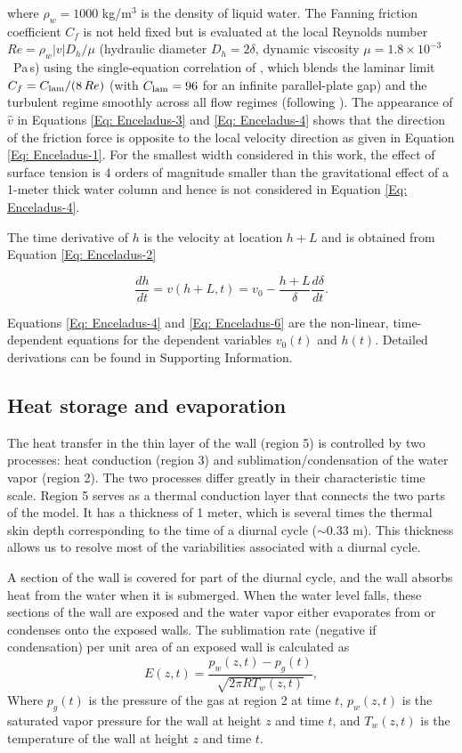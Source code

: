 \documentclass[draft]{agujournal2019}
\begin{document}
where $\rho_w=1000$ kg/m$^3$ is the density of liquid water. The Fanning friction coefficient $C_f$ is not held fixed but is evaluated at the local Reynolds number $Re = \rho_w |v| D_h / \mu$ (hydraulic diameter $D_h = 2\delta$, dynamic viscosity $\mu = 1.8\times10^{-3}$~Pa\,s) using the single-equation correlation of , which blends the laminar limit $C_f = C_{\rm lam}/(8\,Re)$ (with $C_{\rm lam}=96$ for an infinite parallel-plate gap) and the turbulent regime smoothly across all flow regimes (following ). The appearance of $\hat{v}$ in Equations \ref{Eq: Enceladus-3} and \ref{Eq: Enceladus-4} shows that the direction of the friction force is opposite to the local velocity direction as given in Equation \ref{Eq: Enceladus-1}. For the smallest width considered in this work, the effect of surface tension is 4 orders of magnitude smaller than the gravitational effect of a 1-meter thick water column and hence is not considered in Equation \ref{Eq: Enceladus-4}.

The time derivative of $h$ is the velocity at location $h+L$ and is obtained from Equation \ref{Eq: Enceladus-2}

\begin{equation}
    \frac{dh}{dt} = v(h+L,t) = v_0 - \frac{h+L}{\delta} \frac{d\delta}{dt}.
\label{Eq: Enceladus-6}
\end{equation}

Equations \ref{Eq: Enceladus-4} and \ref{Eq: Enceladus-6} are the non-linear, time-dependent equations for the dependent variables $v_0(t)$ and $h(t)$. Detailed derivations can be found in Supporting Information.

\subsection{Heat storage and evaporation}
\label{sec:heat}
The heat transfer in the thin layer of the wall (region 5) is controlled by two processes: heat conduction (region 3) and sublimation/condensation of the water vapor (region 2). The two processes differ greatly in their characteristic time scale. Region 5 serves as a thermal conduction layer that connects the two parts of the model. It has a thickness of 1 meter, which is several times the thermal skin depth corresponding to the time of a diurnal cycle ($\sim$0.33 m). This thickness allows us to resolve most of the variabilities associated with a diurnal cycle.

A section of the wall is covered for part of the diurnal cycle, and the wall absorbs heat from the water when it is submerged. When the water level falls, these sections of the wall are exposed and the water vapor either evaporates from or condenses onto the exposed walls. The sublimation rate (negative if condensation) per unit area of an exposed wall is calculated as
\begin{equation}
    E(z,t) = \frac{p_w(z,t) - p_g(t)}{\sqrt{2\pi R T_w(z,t)}},
\end{equation}
Where $p_g(t)$ is the pressure of the gas at region 2 at time $t$, $p_w(z,t)$ is the saturated vapor pressure for the wall at height $z$ and time $t$, and $T_w(z,t)$ is the temperature of the wall at height
$z$ and time $t$.
\end{document}
